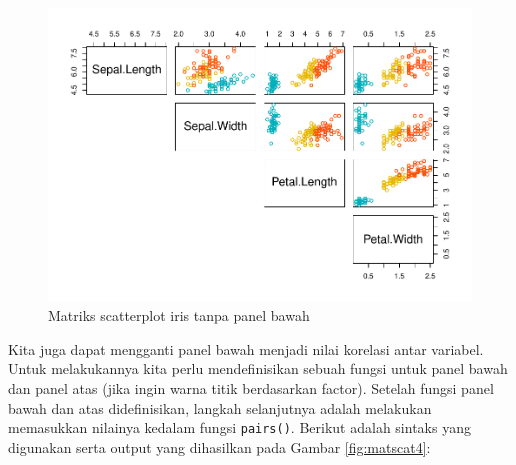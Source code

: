 \documentclass[]{book}
\begin{document}
\begin{figure}

{\centering \includegraphics[width=0.8\linewidth]{EnvStat_files/figure-latex/matscat3-1} 

}

\caption{Matriks scatterplot iris tanpa panel bawah}\label{fig:matscat3}
\end{figure}

Kita juga dapat mengganti panel bawah menjadi nilai korelasi antar
variabel. Untuk melakukannya kita perlu mendefinisikan sebuah fungsi
untuk panel bawah dan panel atas (jika ingin warna titik berdasarkan
factor). Setelah fungsi panel bawah dan atas didefinisikan, langkah
selanjutnya adalah melakukan memasukkan nilainya kedalam fungsi
\texttt{pairs()}. Berikut adalah sintaks yang digunakan serta output
yang dihasilkan pada Gambar \ref{fig:matscat4}:
\end{document}
